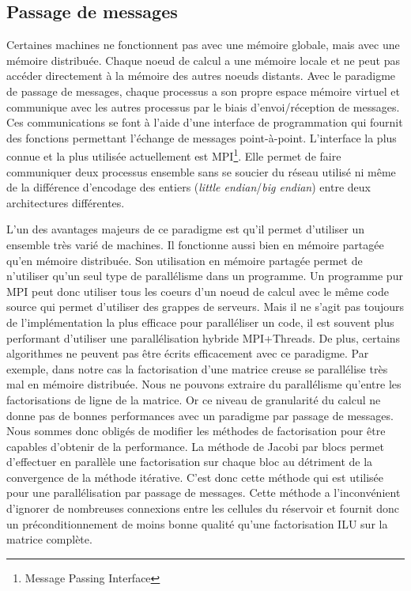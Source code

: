 \subsection{Passage de messages}
Certaines machines ne fonctionnent pas avec une mémoire globale, mais avec une mémoire distribuée.
% 
Chaque noeud de calcul a une mémoire locale et ne peut pas accéder directement à la mémoire des autres noeuds distants.
%
Avec le paradigme de passage de messages, chaque processus a son propre espace mémoire virtuel et communique avec les autres processus par le biais d'envoi/réception de messages.
%
Ces communications se font à l'aide d'une interface de programmation qui fournit des fonctions permettant l'échange de messages point-à-point.
%
L'interface la plus connue et la plus utilisée actuellement est MPI\footnote{Message Passing Interface}.
%
Elle permet de faire communiquer deux processus ensemble sans se soucier du réseau utilisé ni même de la différence d'encodage des entiers ({\em little endian}/{\em big endian}) entre deux architectures différentes.

L'un des avantages majeurs de ce paradigme est qu'il permet d'utiliser un ensemble très varié de machines.
%
Il fonctionne aussi bien en mémoire partagée qu'en mémoire distribuée.
%
Son utilisation en mémoire partagée permet de n'utiliser qu'un seul type de parallélisme dans un programme.
%
Un programme pur MPI peut donc utiliser tous les coeurs d'un noeud de calcul avec le même code source qui permet d'utiliser des grappes de serveurs.
%
Mais il ne s'agit pas toujours de l'implémentation la plus efficace pour paralléliser un code, il est souvent plus performant d'utiliser une parallélisation hybride MPI+Threads\cite{mpi_openmp}.
%
De plus, certains algorithmes ne peuvent pas être écrits efficacement avec ce paradigme.
%
Par exemple, dans notre cas la factorisation d'une matrice creuse se parallélise très mal en mémoire distribuée.
%
Nous ne pouvons extraire du parallélisme qu'entre les factorisations de ligne de la matrice.
%
Or ce niveau de granularité du calcul ne donne pas de bonnes performances avec un paradigme par passage de messages.
%
Nous sommes donc obligés de modifier les méthodes de factorisation pour être capables d'obtenir de la performance.
%
La méthode de Jacobi par blocs permet d'effectuer en parallèle une factorisation sur chaque bloc au détriment de la convergence de la méthode itérative.
%
C'est donc cette méthode qui est utilisée pour une parallélisation par passage de messages.
%
Cette méthode a l'inconvénient d'ignorer de nombreuses connexions entre les cellules du réservoir et fournit donc un préconditionnement de moins bonne qualité qu'une factorisation ILU sur la matrice complète.
